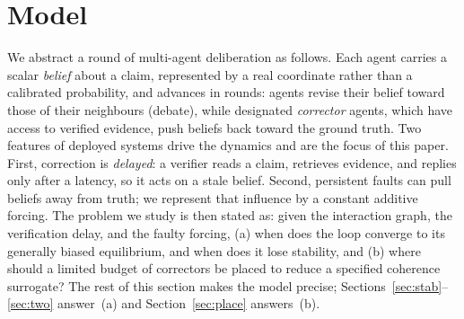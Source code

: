 \documentclass[11pt]{article}
\theoremstyle{definition}
\begin{document}
\section{Model}\label{sec:model}

We abstract a round of multi-agent deliberation as follows. Each agent carries a scalar \emph{belief}
about a claim, represented by a real coordinate rather than a calibrated probability, and advances in
rounds: agents revise their belief toward those of their neighbours (debate), while designated
\emph{corrector} agents, which have access to verified evidence, push beliefs back toward the ground
truth. Two features of deployed systems drive the dynamics and are the focus of this paper. First,
correction is \emph{delayed}: a verifier reads a claim, retrieves evidence, and replies only after a
latency, so it acts on a stale belief. Second, persistent faults can pull beliefs away from truth;
we represent that influence by a constant additive forcing. The problem we study is then stated as:
given the interaction graph, the verification delay, and the faulty forcing, (a) when does the loop
converge to its generally biased equilibrium, and when does it lose stability, and (b) where should a limited
budget of correctors be placed to reduce a specified coherence surrogate? The rest of this section makes the model
precise; Sections~\ref{sec:stab}--\ref{sec:two} answer~(a) and Section~\ref{sec:place} answers~(b).
\end{document}
